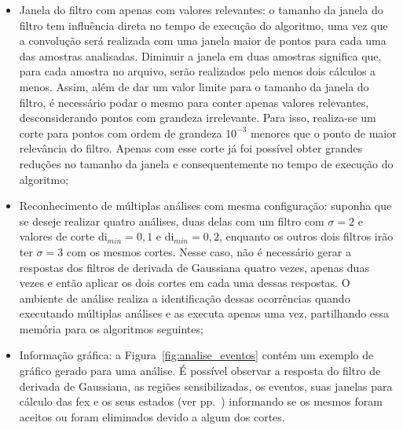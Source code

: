 \begin{itemize}
\item Janela do filtro com apenas com valores relevantes: o tamanho da
janela do filtro tem influência direta no tempo de execução do
algoritmo, uma vez que a convolução será realizada com uma janela
maior de pontos para cada uma das amostras analisadas. Diminuir a
janela em duas amostras significa que, para cada amostra no arquivo,
serão realizados pelo menos dois cálculos a menos. Assim, além de dar
um valor limite para o tamanho da janela do filtro, é necessário podar
o mesmo para conter apenas valores relevantes, desconsiderando pontos
com grandeza irrelevante. Para isso, realiza-se um corte para pontos
com ordem de grandeza $10^{-3}$ menores que o ponto de maior
relevância do filtro. Apenas com esse corte já foi possível obter
grandes reduções no tamanho da janela e consequentemente no tempo de
execução do algoritmo;

\item Reconhecimento de múltiplas análises com mesma configuração:
suponha que se deseje realizar quatro análises, duas delas com um filtro com
$\sigma=2$ e valores de corte \acs{di}$_{min}=0,1$ e
\acs{di}$_{min}=0,2$, enquanto os outros dois filtros irão ter 
$\sigma=3$ com os mesmos cortes. Nesse caso, não é necessário gerar a
respostas dos filtros de derivada de Gaussiana quatro vezes, apenas
duas vezes e então aplicar os dois cortes em cada uma dessas
respostas. O ambiente de análise realiza a identificação dessas
ocorrências quando executando múltiplas análises e as executa apenas
uma vez, partilhando essa memória para os algoritmos seguintes; 

\item Informação gráfica: a Figura~\ref{fig:analise_eventos} contém um
exemplo de gráfico gerado para uma análise. É possível observar a
resposta do filtro de derivada de Gaussiana, as regiões
sensibilizadas, os eventos, suas janelas para cálculo das \acs{fex} e
os seus estados (ver pp.~\pageref{text:estados_eventos}) informando se
os mesmos foram aceitos ou foram eliminados devido a algum dos cortes.

\end{itemize}


